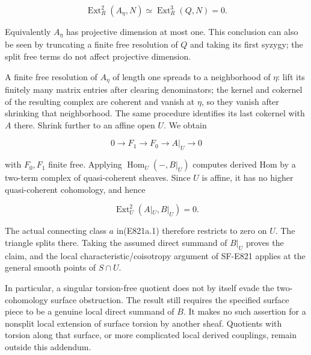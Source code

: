 \[
 \operatorname{Ext}^2_R(A_\eta,N)
      \simeq\operatorname{Ext}^3_R(Q,N)=0.
 \tag{E821a.3}
\]

Equivalently \(A_\eta\) has projective dimension at most one. This
conclusion can also be seen by truncating a finite free resolution of
\(Q\) and taking its first syzygy; the split free terms do not affect
projective dimension.

A finite free resolution of \(A_\eta\) of length one spreads to a
neighborhood of \(\eta\): lift its finitely many matrix entries after
clearing denominators; the kernel and cokernel of the resulting complex
are coherent and vanish at \(\eta\), so they vanish after shrinking that
neighborhood. The same procedure identifies its last cokernel with \(A\)
there. Shrink further to an affine open \(U\). We obtain

\[
 0\longrightarrow F_1\longrightarrow F_0
     \longrightarrow A|_U\longrightarrow0
\]

with \(F_0,F_1\) finite free. Applying \(\operatorname{Hom}_U(-,B|_U)\)
computes derived Hom by a two-term complex of quasi-coherent sheaves.
Since \(U\) is affine, it has no higher quasi-coherent cohomology, and
hence

\[
 \operatorname{Ext}^2_U(A|_U,B|_U)=0.
 \tag{E821a.4}
\]

The actual connecting class \(a\) in(E821a.1) therefore restricts to
zero on \(U\). The triangle splits there. Taking the assumed direct
summand of \(B|_U\) proves the claim, and the local
characteristic/coisotropy argument of SF-E821 applies at the general
smooth points of \(S\cap U\).

In particular, a singular torsion-free quotient does not by itself evade
the two-cohomology surface obstruction. The result still requires the
specified surface piece to be a genuine local direct summand of \(B\).
It makes no such assertion for a nonsplit local extension of surface
torsion by another sheaf. Quotients with torsion along that surface, or
more complicated local derived couplings, remain outside this addendum.
